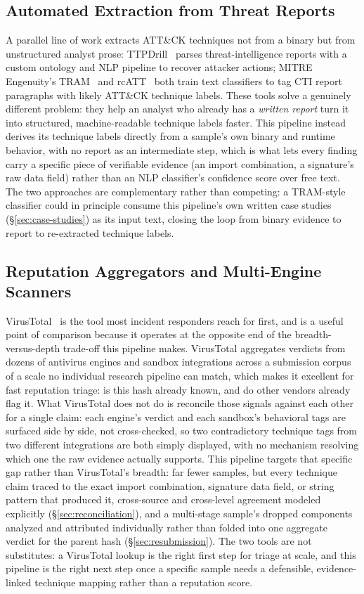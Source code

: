 \subsection{Automated Extraction from Threat Reports}

A parallel line of work extracts ATT\&CK techniques not from a binary
but from unstructured analyst prose: TTPDrill~\cite{ttpdrill} parses
threat-intelligence reports with a custom ontology and NLP pipeline to
recover attacker actions; MITRE Engenuity's TRAM~\cite{tram} and
rcATT~\cite{rcatt} both train text classifiers to tag CTI report
paragraphs with likely ATT\&CK technique labels. These tools solve a
genuinely different problem: they help an analyst who already has a
\emph{written report} turn it into structured, machine-readable
technique labels faster. This pipeline instead derives its technique
labels directly from a sample's own binary and runtime behavior, with
no report as an intermediate step, which is what lets every finding
carry a specific piece of verifiable evidence (an import combination,
a signature's raw data field) rather than an NLP classifier's
confidence score over free text. The two approaches are complementary
rather than competing: a TRAM-style classifier could in principle
consume this pipeline's own written case studies (\S\ref{sec:case-studies})
as its input text, closing the loop from binary evidence to report to
re-extracted technique labels.

\subsection{Reputation Aggregators and Multi-Engine Scanners}

VirusTotal~\cite{virustotal} is the tool most incident responders reach
for first, and is a useful point of comparison because it operates at
the opposite end of the breadth-versus-depth trade-off this pipeline
makes. VirusTotal aggregates verdicts from dozens of antivirus engines
and sandbox integrations across a submission corpus of a scale no
individual research pipeline can match, which makes it excellent for
fast reputation triage: is this hash already known, and do other
vendors already flag it. What VirusTotal does not do is reconcile
those signals against each other for a single claim: each engine's
verdict and each sandbox's behavioral tags are surfaced side by side,
not cross-checked, so two contradictory technique tags from two
different integrations are both simply displayed, with no mechanism
resolving which one the raw evidence actually supports. This pipeline
targets that specific gap rather than VirusTotal's breadth: far fewer
samples, but every technique claim traced to the exact import
combination, signature data field, or string pattern that produced it,
cross-source and cross-level agreement modeled explicitly
(\S\ref{sec:reconciliation}), and a multi-stage sample's dropped
components analyzed and attributed individually rather than folded
into one aggregate verdict for the parent hash
(\S\ref{sec:resubmission}). The two tools are not substitutes: a
VirusTotal lookup is the right first step for triage at scale, and this
pipeline is the right next step once a specific sample needs a
defensible, evidence-linked technique mapping rather than a reputation
score.

